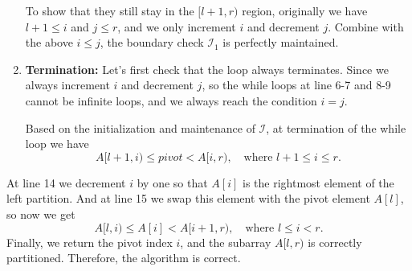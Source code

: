 \documentclass[12pt]{article}
\begin{document}
\begin{enumerate}
    To show that they still stay in the \([l + 1, r)\) region, originally we have \(l + 1 \leq i\) and \(j \leq r\), and we only increment \(i\) and decrement \(j\). Combine with the above \(i \leq j\), the boundary check \(\mathcal{I}_1\) is perfectly maintained.

    \item \textbf{Termination:} Let's first check that the loop always terminates. Since we always increment \(i\) and decrement \(j\), so the while loops at line 6-7 and 8-9 cannot be infinite loops, and we always reach the condition \(i = j\).

    Based on the initialization and maintenance of \(\mathcal{I}\), at termination of the while loop we have
    \[
        A[l + 1, i) \leq pivot < A[i, r), \quad \text{where } l + 1 \leq i \leq r.
    \]
\end{enumerate}
At line 14 we decrement \(i\) by one so that \(A[i]\) is the rightmost element of the left partition. And at line 15 we swap this element with the pivot element \(A[l]\), so now we get
\[
    A[l, i) \leq A[i] < A[i + 1, r), \quad \text{where } l \leq i < r.
\]
Finally, we return the pivot index \(i\), and the subarray \(A[l, r)\) is correctly partitioned. Therefore, the algorithm is correct.
\end{document}
